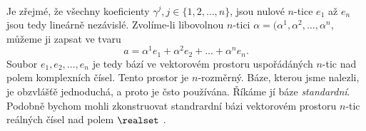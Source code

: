 \begin{mdframed}[style=mdexam]
\begin{example}
\begin{align*}
    \end{align*}
    Je zřejmé, že všechny koeficienty \(\gamma^j, j\in\{1,2,\ldots,n\}\), jsou nulové \(n\)-tice
    \(e_1\) až \(e_n\) jsou tedy lineárně nezávislé. Zvolíme-li libovolnou \(n\)-tici
    \(\alpha=(\alpha^1, \alpha^2,\ldots, \alpha^n\), můžeme ji zapsat ve tvaru
    \begin{equation*}
      a = \alpha^1e_1 + \alpha^2e_2 + \ldots + \alpha^ne_n.
    \end{equation*}
    Soubor \(e_1, e_2, \ldots, e_n\) je tedy bází ve vektorovém prostoru uspořádáných \(n\)-tic nad
    polem komplexních čísel. Tento prostor je \(n\)-rozměrný. Báze, kterou jsme nalezli, je
    obzvlášťě jednoduchá, a proto je čsto používána. Říkáme jí báze \emph{standardní}. Podobně
    bychom mohli zkonstruovat standrardní bázi vektorovém prostoru \(n\)-tic reálných čísel nad
    polem \(\realset\) \cite[s.~27]{Musilova2012MA2}.
    \endgroup
  \end{example}
\end{mdframed}